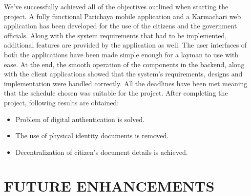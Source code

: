 
We've successfully achieved all of the objectives outlined when starting the project. A fully functional Parichaya mobile application and a Karmachari web application has been developed for the use of the citizens and the government officials. Along with the system requirements that had to be implemented, additional features are provided by the application as well. The user interfaces of both the applications have been made simple enough for a layman to use with ease. At the end, the smooth operation of the components in the backend, along with the client applications showed that the system's requirements, designs and implementation were handled correctly. All the deadlines have been met meaning that the schedule chosen was suitable for the project. After completing the project, following results are obtained: 
\begin{itemize}[itemsep=-4pt, topsep=-8pt]
    \item Problem of digital authentication is solved.
    \item The use of physical identity documents is removed.
    \item Decentralization of citizen's document details is achieved. 
\end{itemize}

\section{FUTURE ENHANCEMENTS}




